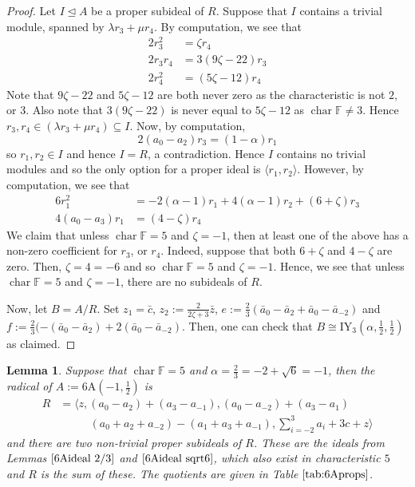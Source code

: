 \documentclass[11pt, a4paper]{article}
\theoremstyle{plain}
\newtheorem{lemma}[theorem]{Lemma}
\theoremstyle{definition}
\newcommand\al{\alpha}
\newcommand\lm{\lambda}
\newcommand\la{\langle}
\newcommand\ra{\rangle}
\DeclareMathOperator{\ch}{char}
\newcommand\FF{\mathbb{F}}
\newcommand{\A}{\mathrm{A}}
\newcommand{\IY}{\mathrm{IY}}
\newcommand{\0}{\overline{0}}
\newcommand{\2}{\overline{2}}
\newcommand{\1}{\mathbbm{1}}
\begin{document}
\begin{proof}
Let $I \unlhd A$ be a proper subideal of $R$.  Suppose that $I$ contains a trivial module, spanned by $\lm r_3 + \mu r_4$. By computation, we see that
\begin{align*}
2r_3^2 &= \zeta r_4 \\
2r_3 r_4 &= 3(9\zeta - 22) r_3 \\
2r_4^2 &= (5\zeta - 12) r_4
\end{align*}
Note that $9\zeta - 22$ and $5\zeta - 12$ are both never zero as the characteristic is not $2$, or $3$.  Also note that $3(9\zeta - 22)$ is never equal to $5\zeta -12$ as $\ch \FF \neq 3$.  Hence $r_3, r_4 \in (\lm r_3 + \mu r_4) \subseteq I$.  Now, by computation,
\[
2(a_0-a_2)r_3 = (1-\al) r_1
\]
so $r_1, r_2 \in I$ and hence $I = R$, a contradiction.  Hence $I$ contains no trivial modules and so the only option for a proper ideal is $\la r_1, r_2 \ra$.  However, by computation, we see that
\begin{align}
	6 r_1^2 & = -2(\al-1)r_1 + 4(\al-1)r_2 + ( 6 + \zeta) r_3 \label{sqrt6 eqn1}\\
	4(a_0 - a_3)r_1 &= (4 - \zeta) r_4 \label{sqrt6 eqn2}
\end{align}
We claim that unless $\ch \FF = 5$ and $\zeta =-1$, then at least one of the above has a non-zero coefficient for $r_3$, or $r_4$.  Indeed, suppose that both $6 +\zeta$ and $4 -\zeta$ are zero.  Then, $\zeta = 4 = -6$ and so $\ch \FF = 5$ and $\zeta = -1$.  Hence, we see that unless $\ch \FF = 5$ and $\zeta = -1$, there are no subideals of $R$.

Now, let $B = A/R$.  Set $z_1 = \bar{c}$, $z_2 := \frac{2}{2\zeta +3} \bar{z}$, $e := \frac{2}{3}(\bar{a}_0 - \bar{a}_2 + \bar{a}_0 - \bar{a}_{-2})$ and $f := \frac{2}{3}( -(\bar{a}_0 - \bar{a}_2) + 2(\bar{a}_0 - \bar{a}_{-2})$.  Then, one can check that $B \cong \IY_3(\al, \frac{1}{2}, \frac{1}{2})$ as claimed.
\end{proof}












\begin{lemma}
Suppose that $\ch \FF = 5$ and $\al = \tfrac{2}{3} = -2+\sqrt{6} = -1$, then the radical of $A := 6\A(-1, \frac{1}{2})$ is	
\begin{align*}
	R &= \la z, (a_0 -a_2)+(a_3-a_{-1}), (a_0-a_{-2}) + (a_3-a_1) \\
	&\phantom{{}={}\la} \quad (a_0+a_2+a_{-2})-(a_1+a_3+a_{-1}), \sum_{i=-2}^{3}a_i +3c +z
	 \ra
\end{align*}
and there are two non-trivial proper subideals of $R$.  These are the ideals from Lemmas $\ref{6Aideal 2/3}$ and $\ref{6Aideal sqrt6}$, which also exist in characteristic $5$ and $R$ is the sum of these.  The quotients are given in Table $\ref{tab:6Aprops}$.
\end{lemma}
\end{document}

